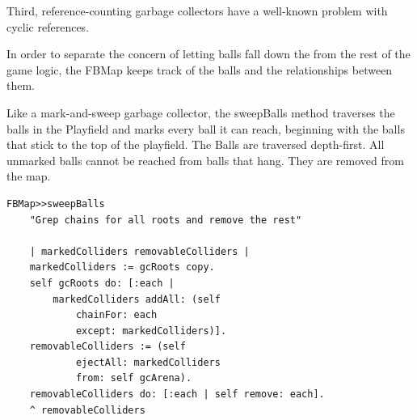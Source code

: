Third, reference-counting garbage collectors have a well-known problem with cyclic references.

In order to separate the concern of letting balls fall down the from the rest of the game logic, the FBMap keeps track of the balls and the relationships between them.

Like a mark-and-sweep garbage collector, the sweepBalls method traverses the balls in the Playfield and marks every ball it can reach, beginning with the balls that stick to the top of the playfield. The Balls are traversed depth-first. All unmarked balls cannot be reached from balls that hang. They are removed from the map.

%
\begin{lstlisting}[language=Smalltalk, label=lst:sweep, caption=Mark-and-Sweep Ball Collector, float]
FBMap>>sweepBalls
	"Grep chains for all roots and remove the rest"
	
	| markedColliders removableColliders |
	markedColliders := gcRoots copy.
	self gcRoots do: [:each | 
		markedColliders addAll: (self 
			chainFor: each 
			except: markedColliders)].
	removableColliders := (self
			ejectAll: markedColliders
			from: self gcArena).
	removableColliders do: [:each | self remove: each].
	^ removableColliders
\end{lstlisting}
%
